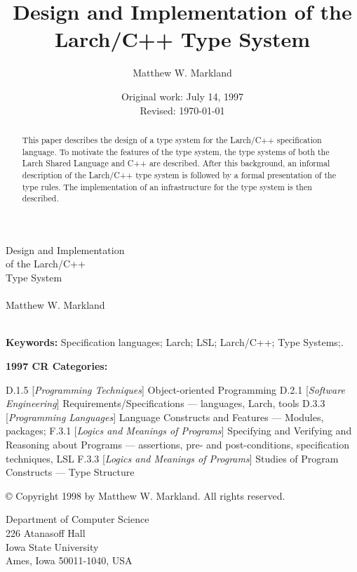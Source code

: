 \documentclass[12pt]{article} %
\begin{document}
\begin{titlepage}
\vspace*{1.2in}
\begin{center}
{\LARGE Design and Implementation\\ of the Larch/C++\\ Type System} \\
~ \\
Matthew W. Markland \\
 ~ \\
\end{center}

\thispagestyle{empty}
\vfill
{\bf Keywords:} Specification languages; Larch; LSL; Larch/C++; Type Systems;.


{\bf 1997 CR Categories:}

\noindent D.1.5 [{\em Programming Techniques}]
        Object-oriented Programming
D.2.1 [{\em Software Engineering\/}]
	Requirements/Spec\-ifications --- languages, Larch,
        tools
D.3.3 [{\em Programming Languages\/}]
        Language Constructs and Features ---  Modules, packages;
F.3.1 [{\em Logics and Meanings of Programs\/}]
        Specifying and Verifying and Reasoning about Programs ---
                assertions, pre- and post-conditions,
                specification techniques, LSL
F.3.3 [{\em Logics and Meanings of Programs\/}]
        Studies of Program Constructs --- Type Structure

\vspace*{0.2in}

\copyright{} 
        Copyright 1998 by Matthew W. Markland.
        All rights reserved.
\begin{center}
Department of Computer Science \\
226 Atanasoff Hall \\
Iowa State University \\
Ames, Iowa 50011-1040, USA
\end{center}
\end{titlepage}
\newpage
\tableofcontents
\newpage
\listoffigures
\newpage



\setcounter{page}{1}

\author{Matthew W. Markland }
\title{Design and Implementation of the Larch/C++ Type System}
\date{Original work: July 14, 1997 \\ Revised: \today}
\maketitle
\begin{abstract}
This paper describes the design of a type system for the Larch/C++
specification language. To motivate the features of the type system,
the type systems of both the Larch Shared Language and C++ are
described. After this background, an informal description of the
Larch/C++ type system is followed by a formal presentation of the type 
rules. The implementation of an infrastructure for the type system is
then described.
\end{abstract}
\end{document}
